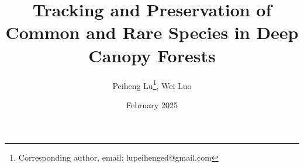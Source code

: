 \documentclass{article}
\title{Tracking and Preservation of Common and Rare Species in Deep Canopy Forests}
\author{Peiheng Lu\thanks{Corresponding author, email: lupeihenged@gmail.com}, Wei Luo}
\date{February 2025}
\begin{document}
\begin{abstract}
\end{abstract}

\maketitle




\begin{CJK}{UTF8}{bsmi}
\printbibliography
\end{CJK}     
\end{document}

